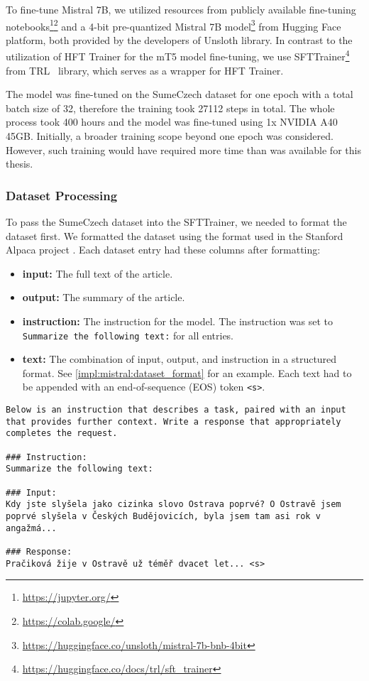 \documentclass[english, ba, kiv, he, iso690numb, pdf, viewonly]{fasthesis}
\begin{document}
To fine-tune Mistral 7B, we utilized resources from publicly available fine-tuning notebooks\footnote{\url{https://jupyter.org/}}\footnote{\url{https://colab.google/}} and a 4-bit pre-quantized Mistral 7B model\footnote{\url{https://huggingface.co/unsloth/mistral-7b-bnb-4bit}} from Hugging Face platform, both provided by the developers of Unsloth library. In contrast to the utilization of HFT Trainer for the mT5 model fine-tuning, we use SFTTrainer\footnote{\url{https://huggingface.co/docs/trl/sft_trainer}} from TRL~\cite{vonwerra2022trl} library, which serves as a wrapper for HFT Trainer.

The model was fine-tuned on the SumeCzech dataset for one epoch with a total batch size of 32, therefore the training took 27112 steps in total. The whole process took 400 hours and the model was fine-tuned using 1x NVIDIA A40 45GB. Initially, a broader training scope beyond one epoch was considered. However, such training would have required more time than was available for this thesis.
\subsubsection{Dataset Processing}
To pass the SumeCzech dataset into the SFTTrainer, we needed to format the dataset first. We formatted the dataset using the format used in the Stanford Alpaca project \cite{alpaca}\cite{touvron2023llama}\cite{wang2023selfinstruct}. Each dataset entry had these columns after formatting:
\begin{itemize}
  \item \textbf{input:} The full text of the article.
  \item \textbf{output:} The summary of the article.
  \item \textbf{instruction:} The instruction for the model. The instruction was set to \texttt{Summarize the following text:} for all entries.
  \item \textbf{text:} The combination of input, output, and instruction in a structured format. See \ref{impl:mistral:dataset_format} for an example. Each text had to be appended with an end-of-sequence (EOS) token \texttt{<s>}.
\end{itemize}
\lstset{style=FASThesisLstStyle,} %
\begin{lstlisting}[caption={Example of \texttt{text} column in formatted SumeCzech dataset entry. The input and response were truncated and appended with \texttt{...} due to their long length\label{impl:mistral:dataset_format}}] 
Below is an instruction that describes a task, paired with an input that provides further context. Write a response that appropriately completes the request.

### Instruction:
Summarize the following text:

### Input:
Kdy jste slyšela jako cizinka slovo Ostrava poprvé? O Ostravě jsem poprvé slyšela v Českých Budějovicích, byla jsem tam asi rok v angažmá...

### Response:
Pračiková žije v Ostravě už téměř dvacet let... <s>
\end{lstlisting}
\end{document}
